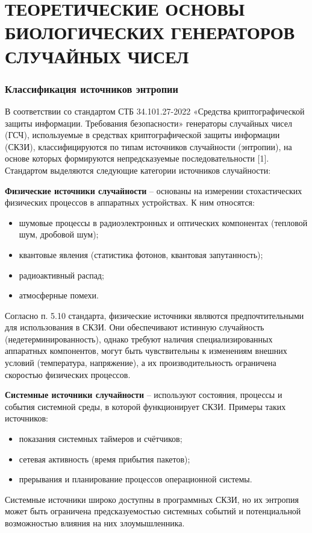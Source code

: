 \documentclass[14pt, a4paper]{extreport}
\newcommand{\resetchaptercounter}{
  \setcounter{chapter}{0}
}
\let\oldchapter\chapter
\renewcommand{\chapter}{%
  \setcounter{subsection}{0}%
  \oldchapter%
}
\begin{document}
\newpage
\resetchaptercounter  %
\chapter{ТЕОРЕТИЧЕСКИЕ ОСНОВЫ БИОЛОГИЧЕСКИХ ГЕНЕРАТОРОВ СЛУЧАЙНЫХ ЧИСЕЛ}

\subsection{Классификация источников энтропии}

В соответствии со стандартом СТБ 34.101.27-2022 «Средства криптографической защиты информации. Требования безопасности» генераторы случайных чисел (ГСЧ), используемые в средствах криптографической защиты информации (СКЗИ), классифицируются по типам источников случайности (энтропии), на основе которых формируются непредсказуемые последовательности [1]. Стандартом выделяются следующие категории источников случайности:

\textbf{Физические источники случайности} – основаны на измерении стохастических физических процессов в аппаратных устройствах. К ним относятся:
\begin{itemize}
    \item шумовые процессы в радиоэлектронных и оптических компонентах (тепловой шум, дробовой шум);
    \item квантовые явления (статистика фотонов, квантовая запутанность);
    \item радиоактивный распад;
    \item атмосферные помехи.
\end{itemize}
Согласно п. 5.10 стандарта, физические источники являются предпочтительными для использования в СКЗИ. Они обеспечивают истинную случайность (недетерминированность), однако требуют наличия специализированных аппаратных компонентов, могут быть чувствительны к изменениям внешних условий (температура, напряжение), а их производительность ограничена скоростью физических процессов.

\textbf{Системные источники случайности} -- используют состояния, процессы и события системной среды, в которой функционирует СКЗИ. Примеры таких источников:
\begin{itemize}
    \item показания системных таймеров и счётчиков;
    \item сетевая активность (время прибытия пакетов);
    \item прерывания и планирование процессов операционной системы.
\end{itemize}
Системные источники широко доступны в программных СКЗИ, но их энтропия может быть ограничена предсказуемостью системных событий и потенциальной возможностью влияния на них злоумышленника.
\end{document}
